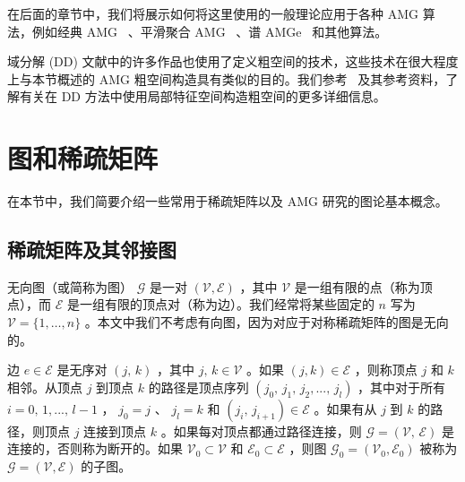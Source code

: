 \documentclass[12pt]{acta_2011xz}
\begin{document}
在后面的章节中，我们将展示如何将这里使用的一般理论应用于各种 AMG 算法，例如经典 AMG~    \cite{1stAMG,Ruge.J;Stuben.K.1987a}   、平滑聚合 AMG~    \cite{Mika.S;Vanek.P.1992a,Mika.S;Vanek.P.1992b}   、谱 AMGe~    \cite{Chartier.T;Falgout.R;Henson.V;Jones.J;Manteuffel.T;McCormick.S;Ruge.J;Vassilevski.P.2003b,2011EfendievY_GalvisJ_VassilevskiP-aa}    和其他算法。  

域分解 (DD) 文献中的许多作品也使用了定义粗空间的技术，这些技术在很大程度上与本节概述的 AMG 粗空间构造具有类似的目的。我们参考~   \cite{2005ToselliA_WidlundO-aa,2009WidlundO-aa,1994WidlundO-aa,2008DohrmannC_KlawonnA_WidlundO-aa,2014SpillaneN_DoleanV_HauretP_NatafF_PechsteinC_ScheichlR-aa}    及其参考资料，了解有关在 DD 方法中使用局部特征空间构造粗空间的更多详细信息。  

   \section{图和稀疏矩阵  }       \label{sec:graphs}    在本节中，我们简要介绍一些常用于稀疏矩阵以及 AMG 研究的图论基本概念。  

   \subsection{稀疏矩阵及其邻接图  }       \label{s:ugraph}    无向图（或简称为图）    $\mathcal{G}$    是一对    $(\mathcal{V},\mathcal{E})$    ，其中    $\mathcal{V}$    是一组有限的点（称为顶点），而    $\mathcal{E}$    是一组有限的顶点对（称为边）。我们经常将某些固定的    $n$    写为
   $\mathcal V= \{ 1,\ldots,n \} $    。本文中我们不考虑有向图，因为对应于对称稀疏矩阵的图是无向的。  

边    $e\in \mathcal{E}$    是无序对    $(j,\,k)$    ，其中
   $j,\,k \in \mathcal{V}$    。如果    $(j,k)\in \mathcal{E}$    ，则称顶点    $j$    和    $k$    相邻。从顶点
   $j$    到顶点    $k$    的路径是顶点序列    $(j_0,\,j_1,\,j_2,...,\,j_l)$    ，其中对于所有    $i = 0,\,1, ...,\,l-1$    ，    $j_0=j$    、    $j_l = k$    和    $(j_i,\,j_{i+1}) \in
\mathcal{E}$    。如果有从    $j$    到
   $k$    的路径，则顶点    $j$    连接到顶点    $k$    。如果每对顶点都通过路径连接，则    $\mathcal{G}=(\mathcal{V}, \,\mathcal{E})$    是连接的，否则称为断开的。如果
   $\mathcal{V}_0\subset\mathcal{V}$    和
   $\mathcal{E}_0\subset\mathcal{E}$    ，则图
   $\mathcal{G}_0=(\mathcal{V}_0,\mathcal{E}_0)$    被称为    $\mathcal{G}=(\mathcal{V},\mathcal{E})$    的子图。  
\end{document}
